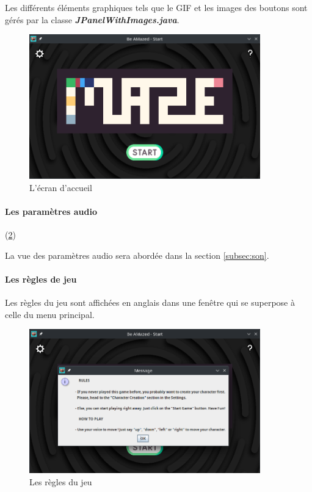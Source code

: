 Les différents éléments graphiques tels que le GIF et les images des boutons sont gérés par la classe \textbf{\textit{JPanelWithImages.java}}.

\begin{figure}[h!]
    \centering
    \includegraphics[width=10cm]{ressources/Implementation/Labyrinthe/Controleur/StartMenu.png}%
    \caption{L'écran d'accueil}
    \label{fig:StartMenu}
\end{figure}
\FloatBarrier

\paragraph{Les paramètres audio} (\ref{fig:Rules})

La vue des paramètres audio sera abordée dans la section \ref{subsec:son}.

\paragraph{Les règles de jeu}

Les règles du jeu sont affichées en anglais dans une fenêtre qui se superpose à celle du menu principal.

\begin{figure}[h!]
    \centering
    \includegraphics[width=10cm]{ressources/Implementation/Labyrinthe/Controleur/Rules.png}%
    \caption{Les règles du jeu}
    \label{fig:Rules}
\end{figure}
\FloatBarrier

